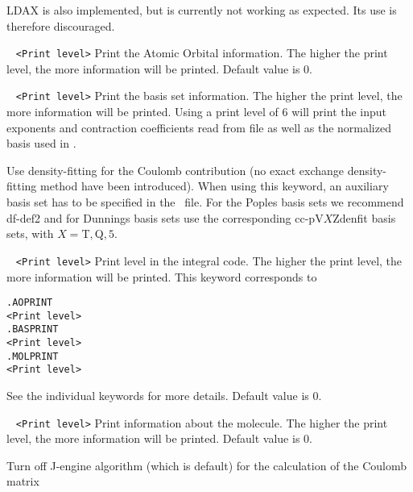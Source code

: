 \begin{description}
LDAX is also implemented, but is currently not working as expected. Its use is
therefore discouraged.

\item[\Key{AOPRINT}] 
\verb| | \newline
\verb|<Print level>|\newline
Print the Atomic Orbital information. The higher the print level, the more information will be printed. Default value is 0.
\item[\Key{BASPRINT}] 
\verb| | \newline
\verb|<Print level>|\newline
Print the basis set information. The higher the print level, the more information will be printed.
Using a print level of 6 will print the input exponents and contraction coefficients read from file as well as the normalized basis used in \lsdalton.  
\item[\Key{DENSFIT}] Use density-fitting for the Coulomb contribution (no exact exchange density-fitting method have been introduced). 
When using this keyword, an auxiliary basis set has to be 
specified in the \mol\ file. For the Poples basis sets we recommend df-def2 and for
Dunnings basis sets use the corresponding cc-pV$X$Zdenfit basis sets, with $X=$T$,$Q$,5$.
\item[\Key{LINSCAPRINT}] 
\verb| | \newline
\verb|<Print level>|\newline
Print level in the integral code. The higher the print level, the more information will be printed. This keyword corresponds to 
\begin{verbatim}
.AOPRINT
<Print level>
.BASPRINT
<Print level>
.MOLPRINT
<Print level>
\end{verbatim} 
See the individual keywords for more details. Default value is 0.
\item[\Key{MOLPRINT}] 
\verb| | \newline
\verb|<Print level>|\newline
Print information about the molecule. The higher the print level, the more information will be printed. Default value is 0.
\item[\Key{NOJENGINE}] Turn off J-engine algorithm (which is default) for the calculation of the Coulomb matrix 

\end{description}
